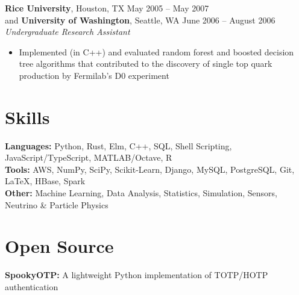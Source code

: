 \documentclass[margin,line]{resume}
\begin{document}
\begin{resume}
    \textbf{Rice University}, Houston, TX \hfill May 2005 -- May 2007 \vspace{1mm}\\\vspace{1mm}%
    and \textbf{University of Washington}, Seattle, WA \hfill June 2006 -- August 2006 \vspace{1mm}\\\vspace{1mm}%
    \textsl{Undergraduate Research Assistant}
    \begin{itemize}
    \item Implemented (in C++) and evaluated random forest and boosted decision tree algorithms that contributed to the discovery of single top quark production by Fermilab's D0 experiment
    \end{itemize}

    \section{\mysidestyle Skills}\vspace{0mm}%
    \textbf{Languages:} Python, Rust, Elm, C++, SQL, Shell Scripting, JavaScript/TypeScript, MATLAB/Octave, R
    \vspace{1mm}\\\vspace{0mm}%
    \textbf{Tools:} AWS, NumPy, SciPy, Scikit-Learn, Django, MySQL, PostgreSQL, Git, \LaTeX, HBase, Spark
    \vspace{1mm}\\\vspace{0mm}%
    \textbf{Other:} Machine Learning, Data Analysis, Statistics, Simulation, Sensors, Neutrino \& Particle Physics

    \section{\mysidestyle Open Source}\vspace{0mm}%
    \textbf{SpookyOTP:} A lightweight Python implementation of TOTP/HOTP authentication
    \vspace{1mm}%


\end{resume}
\end{document}
